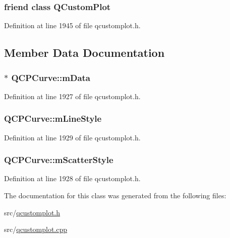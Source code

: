 \hypertarget{class_q_c_p_curve_a1cdf9df76adcfae45261690aa0ca2198}{
\subsubsection[{Q\-Custom\-Plot}]{\setlength{\rightskip}{0pt plus 5cm}friend class {\bf Q\-Custom\-Plot}\hspace{0.3cm}{\ttfamily [friend]}}}\label{class_q_c_p_curve_a1cdf9df76adcfae45261690aa0ca2198}


Definition at line 1945 of file qcustomplot.\-h.



\subsection{Member Data Documentation}
\hypertarget{class_q_c_p_curve_a88d533e455bca96004b049e99168731b}{
\subsubsection[{m\-Data}]{$\ast$ Q\-C\-P\-Curve\-::m\-Data\hspace{0.3cm}{\ttfamily [protected]}}}\label{class_q_c_p_curve_a88d533e455bca96004b049e99168731b}


Definition at line 1927 of file qcustomplot.\-h.

\hypertarget{class_q_c_p_curve_ae1f35ae2b15aee8e15bcdfec5be95156}{
\subsubsection[{m\-Line\-Style}]{ Q\-C\-P\-Curve\-::m\-Line\-Style\hspace{0.3cm}{\ttfamily [protected]}}}\label{class_q_c_p_curve_ae1f35ae2b15aee8e15bcdfec5be95156}


Definition at line 1929 of file qcustomplot.\-h.

\hypertarget{class_q_c_p_curve_a08f803b4a30b01bbd7a1eab15d0f864f}{
\subsubsection[{m\-Scatter\-Style}]{ Q\-C\-P\-Curve\-::m\-Scatter\-Style\hspace{0.3cm}{\ttfamily [protected]}}}\label{class_q_c_p_curve_a08f803b4a30b01bbd7a1eab15d0f864f}


Definition at line 1928 of file qcustomplot.\-h.



The documentation for this class was generated from the following files\-:\begin{DoxyCompactItemize}
\item 
src/\hyperlink{qcustomplot_8h}{qcustomplot.\-h}\item 
src/\hyperlink{qcustomplot_8cpp}{qcustomplot.\-cpp}\end{DoxyCompactItemize}
